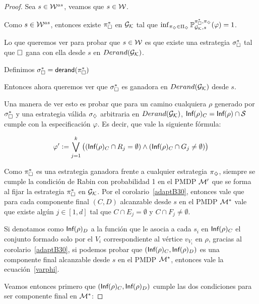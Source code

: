 \begin{proof}
	Sea $s \in \mathcal{W}^{as}$, veamos que $s \in \mathcal{W}$.

	Como $s \in \mathcal{W}^{as}$, entonces existe $\pi_\square^*$ en $\mathcal{G}_{\mathcal{K}}$ tal que
	$\inf_{\pi_\diamondsuit \in \Pi_\diamondsuit}\mathbb{P}_{\mathcal{G}_{\mathcal{K}},s}^{\pi_\square^*, \pi_\diamondsuit}(\varphi) = 1$.

	Lo que queremos ver para probar que $s \in \mathcal{W}$ es que existe una estrategia
	$\sigma_\square^*$ tal que $\square$ gana con ella desde $s$ en $Derand(\mathcal{G}_{\mathcal{K}})$.

	Definimos $\sigma_\square^* = \textsf{derand}(\pi_\square^*)$

	Entonces ahora queremos ver que $\sigma_\square^*$ es ganadora en $Derand(\mathcal{G}_{\mathcal{K}})$ desde
	$s$.

	Una manera de ver esto es probar que para un camino cualquiera $\rho$ generado
	por $\sigma_\square^*$ y una estrategia válida $\sigma_\diamondsuit$ arbitraria en
	$Derand(\mathcal{G}_{\mathcal{K}})$, $\textsf{Inf}(\rho)_C = \textsf{Inf}(\rho) \cap \mathcal{S}$ cumple con la especificación
	$\varphi$. Es decir, que vale la siguiente fórmula:

	\begin{equation}
		\label{varphi}
		\varphi' := \bigvee_{j = 1}^{k} \left((\textsf{Inf}(\rho)_C \cap R_j = \emptyset) \wedge (\textsf{Inf}(\rho)_C \cap G_j \neq \emptyset)  \right)
	\end{equation}

	Como $\pi_\square^*$ es una estrategia ganadora frente a cualquier estrategia
	$\pi_\diamondsuit$, siempre se cumple la condición de Rabin con probabilidad 1 en el
	PMDP $\mathcal{M}'$ que se forma al fijar la estrategia $\pi_\square^*$ en $\mathcal{G}_{\mathcal{K}}$. Por el
	corolario~\ref{adaptB30}, entonces vale que para cada componente final $(C,D)$
	alcanzable desde $s$ en el PMDP $\mathcal{M}^*$ vale que existe algún $j \in [1,d]$ tal
	que $C \cap E_j = \emptyset$ y $C \cap F_j \neq \emptyset$.

	Si denotamos como $\textsf{Inf}(\rho)_D$ a la función que le asocia a cada $s_i$ en
	$\textsf{Inf}(\rho)_C$ el conjunto formado solo por el $V_i$ correspondiente al vértice
	$v_{V_i}$ en $\rho$, gracias al corolario~\ref{adaptB30}, si podemos probar que
	$(\textsf{Inf}(\rho)_C, \textsf{Inf}(\rho)_D)$ es una componente final alcanzable desde $s$ en
	el PMDP $\mathcal{M}^*$, entonces vale la ecuación~\ref{varphi}.%


	Veamos entonces primero que $(\textsf{Inf}(\rho)_C, \textsf{Inf}(\rho)_D)$ cumple las dos
	condiciones para ser componente final en $\mathcal{M}^*$:



\end{proof}
